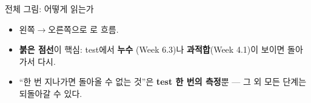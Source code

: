 \begin{frame}{전체 그림: 어떻게 읽는가}
  \begin{itemize}
    \item 왼쪽$\to$오른쪽으로  로 흐름.
    \item \textbf{붉은 점선}이 핵심: test에서 \textbf{누수}
      (Week 6.3)나 \textbf{과적합}(Week 4.1)이 보이면
      돌아가서 다시.
    \item ``한 번 지나가면 돌아올 수 없는 것''은
      \textbf{test 한 번의 측정}뿐 --- 그 외 모든 단계는
      되돌아갈 수 있다.
  \end{itemize}
\end{frame}
